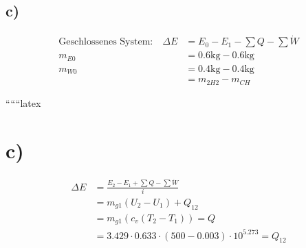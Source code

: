 

\subsection*{c)}
\begin{align*}
\text{Geschlossenes System:} \quad \Delta E &= E_0 - E_1 - \sum Q - \sum \dot{W} \\
m_{E0} &= 0.6 \text{kg} - 0.6 \text{kg} \\
m_{W0} &= 0.4 \text{kg} - 0.4 \text{kg} \\
&= m_{2H2} - m_{CH}
\end{align*}

``````latex



\section*{c)}

\begin{align*}
\Delta E &= \frac{E_2 - E_1 + \sum Q - \sum \dot{W}}{i} \\
&= m_{g1} (U_2 - U_1) + Q_{12} \\
&= m_{g1} \left( c_v (T_2 - T_1) \right) = Q \\
&= 3.429 \cdot 0.633 \cdot (500 - 0.003) \cdot 10^{5.273} = Q_{12}
\end{align*}